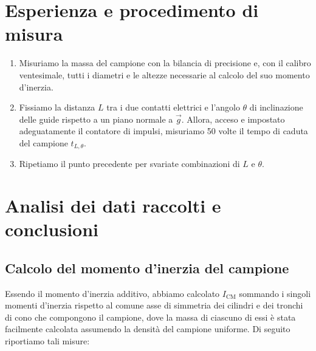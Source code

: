 \documentclass{article}
\begin{document}
\section{Esperienza e procedimento di misura}
\begin{enumerate}
    \item
        Misuriamo la massa del campione con la bilancia di precisione
        e, con il calibro ventesimale, tutti i diametri e le altezze
        necessarie al calcolo del suo momento d'inerzia.
    \item
        Fissiamo la distanza $L$ tra i due contatti elettrici
        e l'angolo $\theta$ di inclinazione delle guide
        rispetto a un piano normale a $\vec{g}$.
        Allora, acceso e impostato adeguatamente il contatore
        di impulsi, misuriamo 50 volte il tempo di caduta del
        campione $t_{L,\theta}$.
    \item
        Ripetiamo il punto precedente per svariate combinazioni
        di $L$ e $\theta$.

\end{enumerate}

\section{Analisi dei dati raccolti e conclusioni}
\subsection{Calcolo del momento d'inerzia del campione}

Essendo il momento d'inerzia additivo, abbiamo calcolato
$I_\text{CM}$ sommando i singoli momenti d'inerzia rispetto al comune
asse di simmetria dei cilindri e dei tronchi di cono che compongono il
campione, dove la massa di ciascuno di essi è stata facilmente
calcolata assumendo la densità del campione uniforme.
Di seguito riportiamo tali misure:
\end{document}
